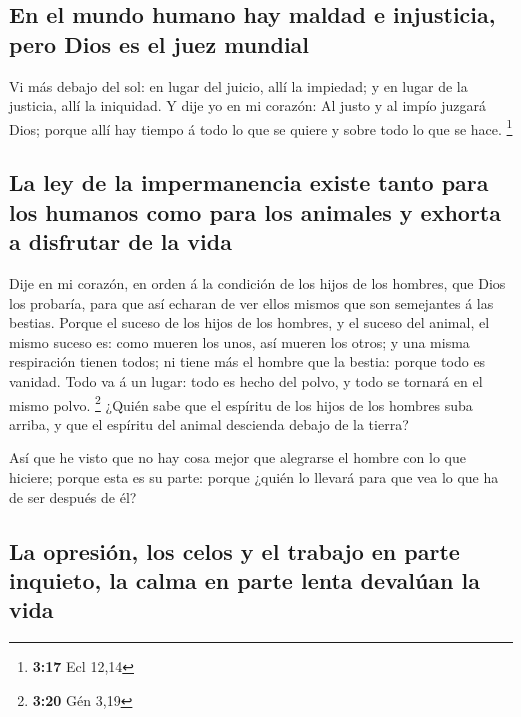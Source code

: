 \hypertarget{en-el-mundo-humano-hay-maldad-e-injusticia-pero-dios-es-el-juez-mundial}{%
\subsection{En el mundo humano hay maldad e injusticia, pero Dios es el
juez
mundial}\label{en-el-mundo-humano-hay-maldad-e-injusticia-pero-dios-es-el-juez-mundial}}

 Vi más debajo del sol: en lugar del juicio, allí la
impiedad; y en lugar de la justicia, allí la iniquidad.  Y
dije yo en mi corazón: Al justo y al impío juzgará Dios; porque allí hay
tiempo á todo lo que se quiere y sobre todo lo que se hace. \footnote{\textbf{3:17}
  Ecl 12,14}

\hypertarget{la-ley-de-la-impermanencia-existe-tanto-para-los-humanos-como-para-los-animales-y-exhorta-a-disfrutar-de-la-vida}{%
\subsection{La ley de la impermanencia existe tanto para los humanos
como para los animales y exhorta a disfrutar de la
vida}\label{la-ley-de-la-impermanencia-existe-tanto-para-los-humanos-como-para-los-animales-y-exhorta-a-disfrutar-de-la-vida}}

 Dije en mi corazón, en orden á la condición de los hijos
de los hombres, que Dios los probaría, para que así echaran de ver ellos
mismos que son semejantes á las bestias.  Porque el suceso
de los hijos de los hombres, y el suceso del animal, el mismo suceso es:
como mueren los unos, así mueren los otros; y una misma respiración
tienen todos; ni tiene más el hombre que la bestia: porque todo es
vanidad.  Todo va á un lugar: todo es hecho del polvo, y
todo se tornará en el mismo polvo. \footnote{\textbf{3:20} Gén 3,19}
 ¿Quién sabe que el espíritu de los hijos de los hombres
suba arriba, y que el espíritu del animal descienda debajo de la tierra?

 Así que he visto que no hay cosa mejor que alegrarse el
hombre con lo que hiciere; porque esta es su parte: porque ¿quién lo
llevará para que vea lo que ha de ser después de él?

\hypertarget{la-opresiuxf3n-los-celos-y-el-trabajo-en-parte-inquieto-la-calma-en-parte-lenta-devaluxfaan-la-vida}{%
\subsection{La opresión, los celos y el trabajo en parte inquieto, la
calma en parte lenta devalúan la
vida}\label{la-opresiuxf3n-los-celos-y-el-trabajo-en-parte-inquieto-la-calma-en-parte-lenta-devaluxfaan-la-vida}}

